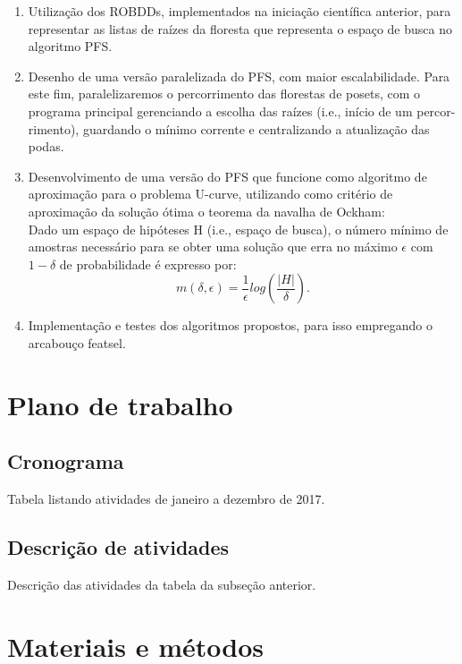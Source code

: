 \documentclass[12pt]{article}
\begin{document}
\begin{enumerate}
\item Utilização dos ROBDDs, implementados na iniciação científica
anterior, para representar as listas de raízes da floresta que 
representa o espaço de busca no algoritmo PFS.

\item Desenho de uma versão paralelizada do PFS, com maior escalabilidade. Para
este fim, paralelizaremos o percorrimento das florestas de posets, com o
programa principal gerenciando a escolha das raízes (i.e., início de um percor-
rimento), guardando o mínimo corrente e centralizando a atualização das podas.

\item Desenvolvimento de uma versão do PFS que funcione como algoritmo de 
aproximação para o problema U-curve, utilizando como critério de aproximação da
solução ótima o teorema da navalha de Ockham:\\
\smallskip
Dado um espaço de hipóteses H (i.e., espaço de busca), o número mínimo de
amostras necessário para se obter uma solução que erra no máximo $\epsilon$ com
$1 - \delta$ de probabilidade é expresso por:
\begin{equation}
\displaystyle  m(\delta,\epsilon) = \frac{1}{\epsilon} log (\frac{|H|}{\delta}).
\end{equation}

\item Implementação e testes dos algoritmos propostos, para isso empregando o 
arcabouço featsel.
\end{enumerate}


\section{Plano de trabalho}

\subsection{Cronograma}

Tabela listando atividades de janeiro a dezembro de 2017.

\subsection{Descrição de atividades}

Descrição das atividades da tabela da subseção anterior.

\section{Materiais e métodos}
\end{document}
